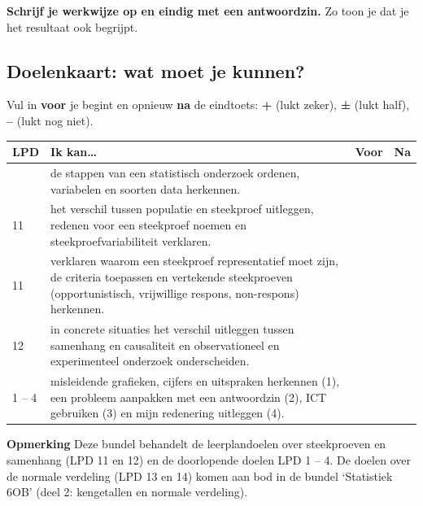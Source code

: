 \begin{letop}
\textbf{Schrijf je werkwijze op en eindig met een antwoordzin.} Zo toon je dat je het resultaat ook begrijpt.
\end{letop}

\subsection*{Doelenkaart: wat moet je kunnen?}

Vul in \textbf{voor} je begint en opnieuw \textbf{na} de eindtoets: \textbf{+} (lukt zeker), \textbf{±} (lukt half), \textbf{–} (lukt nog niet).

\begin{tabular}{llll}
\hline
LPD & Ik kan… & Voor & Na \\
\hline
 & de stappen van een statistisch onderzoek ordenen, variabelen en soorten data herkennen. & & \\
11 & het verschil tussen populatie en steekproef uitleggen, redenen voor een steekproef noemen en steekproefvariabiliteit verklaren. & & \\
11 & verklaren waarom een steekproef representatief moet zijn, de criteria toepassen en vertekende steekproeven (opportunistisch, vrijwillige respons, non-respons) herkennen. & & \\
12 & in concrete situaties het verschil uitleggen tussen samenhang en causaliteit en observationeel en experimenteel onderzoek onderscheiden. & & \\
1 – 4 & misleidende grafieken, cijfers en uitspraken herkennen (1), een probleem aanpakken met een antwoordzin (2), ICT gebruiken (3) en mijn redenering uitleggen (4). & & \\
\hline
\end{tabular}

\begin{letop}
\textbf{Opmerking} \quad Deze bundel behandelt de leerplandoelen over steekproeven en samenhang (LPD 11 en 12) en de doorlopende doelen LPD 1 – 4. De doelen over de normale verdeling (LPD 13 en 14) komen aan bod in de bundel ‘Statistiek 6OB’ (deel 2: kengetallen en normale verdeling).
\end{letop}
